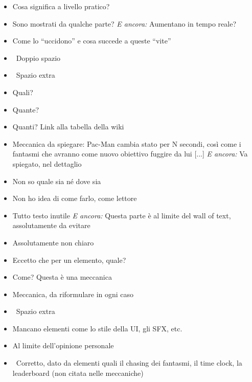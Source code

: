 {\begin{itemize}
  \item {} Cosa significa a livello pratico?
  \item {} Sono mostrati da qualche parte? \emph{E ancora:} Aumentano in tempo reale?
  \item {} Come lo ``uccidono'' e cosa succede a queste ``vite''
  \item \rvVuoto\ Doppio spazio
  \item \rvVuoto\ Spazio extra
  \item {} Quali?
  \item {} Quante?
  \item {} Quanti? Link alla tabella della wiki
  \item {} Meccanica da spiegare: Pac-Man cambia stato per N secondi, così come i fantasmi che avranno come nuovo obiettivo fuggire da lui [...] \emph{E ancora:} Va spiegato, nel dettaglio
  \item {} Non so quale sia né dove sia
  \item {} Non ho idea di come farlo, come lettore
  \item {} Tutto testo inutile \emph{E ancora:} Questa parte è al limite del wall of text, assolutamente da evitare
  \item {} Assolutamente non chiaro
  \item {} Eccetto che per un elemento, quale?
  \item {} Come? Questa è una meccanica
  \item {} Meccanica, da riformulare in ogni caso
  \item \rvVuoto\ Spazio extra
  \item {} Mancano elementi come lo stile della UI, gli SFX, etc.
  \item {} Al limite dell'opinione personale
  \item {} \rvBene\ Corretto, dato da elementi quali il chasing dei fantasmi, il time clock, la leaderboard (non citata nelle meccaniche)

\end{itemize}}
